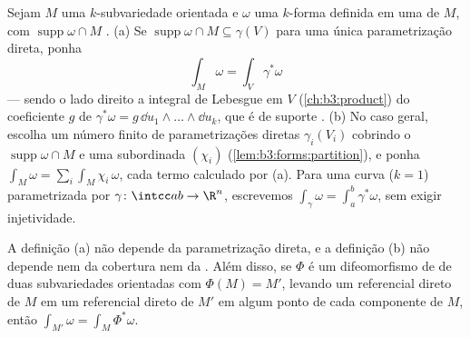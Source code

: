 \begin{definition}\label{def:b3:forms:integral}
Sejam $M$ uma $k$-subvariedade orientada e $\omega$ uma
$k$-forma definida em uma  de $M$, com $\operatorname{supp}\omega \cap M$ .
(a) Se $\operatorname{supp}\omega \cap M \subseteq
\gamma(V)$ para uma única parametrização direta, ponha
\[
\int_M\omega = \int_V\gamma^*\omega
\]
--- sendo o lado direito a integral de Lebesgue em $V$
(\cref{ch:b3:product}) do coeficiente $g$ de $\gamma^*\omega = g\,\dd u_1\wedge\dots\wedge\dd u_k$, que é  de
suporte .
(b) No caso geral, escolha um número finito de parametrizações diretas
$\gamma_i(V_i)$ cobrindo o  $\operatorname{supp}\omega \cap M$ e uma  subordinada
$(\chi_i)$ (\cref{lem:b3:forms:partition}), e ponha $\int_M\omega =
\sum_i\int_M\chi_i\,\omega$, cada termo calculado por (a).
Para uma curva ($k = 1$) parametrizada por $\gamma\colon\intcc ab\to\R^n$, escrevemos $\int_\gamma\omega = \int_a^b\gamma^*\omega$,
sem exigir injetividade.
\end{definition}

\begin{lemma}[Coerência]\label{lem:b3:forms:consistency}
A definição (a) não depende da parametrização direta, e a definição (b)
não depende nem da cobertura nem da . Além disso, se
$\Phi$ é um difeomorfismo de  de duas subvariedades
orientadas com $\Phi(M) = M'$, levando um referencial direto de $M$ em um
referencial direto de $M'$ em algum ponto de cada componente de
$M$, então $\int_{M'}\omega =
\int_M\Phi^*\omega$.
\end{lemma}


